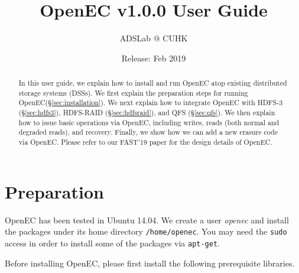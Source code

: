 \documentclass[letterpaper,12pt]{article}
\title{{\bf OpenEC v1.0.0 User Guide}}
\author{ADSLab @ CUHK}
\date{Release: Feb 2019\\}
\newcommand{\openec}{{\sf\small OpenEC}\xspace}
\begin{document}
\maketitle


\tableofcontents

\clearpage

\begin{abstract}
In this user guide, we explain how to install and run \openec atop existing
distributed storage systems (DSSs).  We first explain the preparation steps
for running \openec (\S\ref{sec:installation}).  We next explain how to
integrate \openec with HDFS-3 (\S\ref{sec:hdfs3}), HDFS-RAID
(\S\ref{sec:hdfsraid}), and QFS (\S\ref{sec:qfs}).  We then explain how to
issue basic operations via \openec, including writes, reads (both normal and
degraded reads), and recovery.  Finally, we show how we can add a new erasure
code via \openec.  Please refer to our FAST'19 paper for the design details of
\openec. 
\end{abstract}



\section{Preparation}
\label{sec:installation}

\openec has been tested in Ubuntu 14.04.  We create a user {\sl openec} and
install the packages under its home directory {\tt /home/openec}.  You may
need the {\tt sudo} access in order to install some of the packages via
{\tt apt-get}. 

Before installing \openec, please first install the following prerequisite
libraries.  
\end{document}

